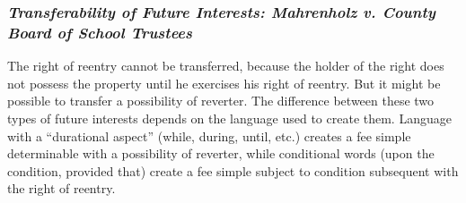 \subsubsection{\emph{Transferability of Future Interests: Mahrenholz v. County 
Board of School Trustees}}

The right of reentry cannot be transferred, because the holder of the right 
does not possess the property until he exercises his right of reentry. But it 
might be possible to transfer a possibility of reverter. The difference 
between these two types of future interests depends on the language used to 
create them. Language with a ``durational aspect'' (while, during, until, 
etc.) creates a fee simple determinable with a possibility of reverter, while 
conditional words (upon the condition, provided that) create a fee simple 
subject to condition subsequent with the right of reentry.

